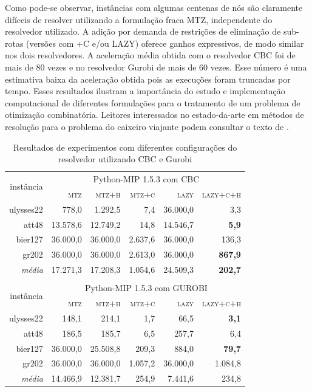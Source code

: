 \documentclass[a4paper,11pt,fleqn]{article}
\begin{document}
Como pode-se observar, instâncias com algumas centenas de nós são claramente difíceis de resolver utilizando a formulação fraca MTZ, independente do resolvedor utilizado. A adição por demanda de restrições de eliminação de sub-rotas (versões com +C e/ou LAZY) oferece ganhos expressivos, de modo similar nos dois resolvedores. A aceleração média obtida com o resolvedor CBC foi de mais de 80 vezes e no resolvedor Gurobi de mais de 60 vezes. Esse número é uma estimativa baixa da aceleração obtida pois as execuções foram truncadas por tempo. Esses resultados ilustram a importância do estudo e implementação computacional de diferentes formulações para o tratamento de um problema de otimização combinatória. Leitores interessados no estado-da-arte em métodos de resolução para o problema do caixeiro viajante podem consultar o texto de \cite{Cook2019}.

\begin{table}
	\begin{center}		
\begin{tabular}{|r|r|r|r|r|r|}
\hline 
\multirow{2}{*}{instância} & \multicolumn{5}{c|}{Python-MIP 1.5.3 com CBC}\tabularnewline
\cline{2-6} \cline{3-6} \cline{4-6} \cline{5-6} \cline{6-6} 
 & \textsc{mtz} & \textsc{mtz+h} & \textsc{mtz+c} & \textsc{lazy} & \textsc{lazy+c+h}\tabularnewline
\hline 
\hline 
ulysses22 & 778,0 & 1.292,5 & 7,4 & \cellcolor{gray}36.000,0 & 3,3\tabularnewline
\hline 
att48 & 13.578,6 & 12.749,2 & 14,8 & 14.546,7 & \textbf{5,9}\tabularnewline
\hline 
bier127 & \cellcolor{gray}36.000,0 & \cellcolor{gray}36.000,0 & 2.637,6 & \cellcolor{gray}36.000,0 & 136,3\tabularnewline
\hline 
gr202 & \cellcolor{gray}36.000,0 & \cellcolor{gray}36.000,0 & 2.613,0 & \cellcolor{gray}36.000,0 & \textbf{867,9}\tabularnewline
\hline 
\hline 
\emph{média} & 17.271,3 & 17.208,3 & 1.054,6 & 24.509,3 & \textbf{202,7}\tabularnewline
\hline 
\multicolumn{1}{r}{} & \multicolumn{1}{r}{} & \multicolumn{1}{r}{} & \multicolumn{1}{r}{} & \multicolumn{1}{r}{} & \multicolumn{1}{r}{}\tabularnewline
\hline 
\multirow{2}{*}{instância} & \multicolumn{5}{c|}{Python-MIP 1.5.3 com GUROBI}\tabularnewline
\cline{2-6} \cline{3-6} \cline{4-6} \cline{5-6} \cline{6-6} 
 & \textsc{mtz} & \textsc{mtz+h} & \textsc{mtz+c} & \textsc{lazy} & \textsc{lazy+c+h}\tabularnewline
\hline 
\hline 
ulysses22 & 148,1 & 214,1 & 1,7 & 66,5 & \textbf{3,1}\tabularnewline
\hline 
att48 & 186,5 & 185,7 & 6,5 & 257,7 & 6,4\tabularnewline
\hline 
bier127 & \cellcolor{gray}36.000,0 & 25.508,8 & 209,3 & 884,0 & \textbf{79,7}\tabularnewline
\hline 
gr202 & \cellcolor{gray}36.000,0 & \cellcolor{gray}36.000,0 & 1.057,2 & 36.000,0 & 1.084,8\tabularnewline
\hline 
\hline 
\emph{média} & 14.466,9 & 12.381,7 & 254,9 & 7.441,6 & 234,8\tabularnewline
\hline 
\end{tabular}

	\label{resExp} \caption{Resultados de experimentos com diferentes configurações do resolvedor utilizando CBC e Gurobi}
	\end{center}	
\end{table}
\end{document}
